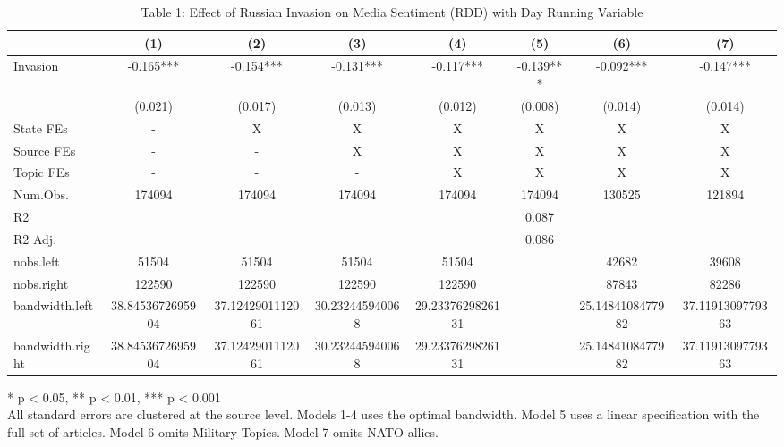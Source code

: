 \begin{table}[!t]
\caption{Table 1: Effect of Russian Invasion on Media Sentiment (RDD) with Day Running Variable} 
\fontsize{12.0pt}{14.4pt}\selectfont
\begin{tabular*}{\linewidth}{@{\extracolsep{\fill}}lccccccc}
\toprule
  & (1) & (2) & (3) & (4) & (5) & (6) & (7) \\ 
\midrule\addlinespace[2.5pt]
Invasion & -0.165*** & -0.154*** & -0.131*** & -0.117*** & -0.139*** & -0.092*** & -0.147*** \\ 
{} & {(0.021)} & {(0.017)} & {(0.013)} & {(0.012)} & {(0.008)} & {(0.014)} & {(0.014)} \\ 
State FEs & - & X & X & X & X & X & X \\ 
Source FEs & - & - & X & X & X & X & X \\ 
Topic FEs & - & - & - & X & X & X & X \\ 
Num.Obs. & 174094 & 174094 & 174094 & 174094 & 174094 & 130525 & 121894 \\ 
R2 &  &  &  &  & 0.087 &  &  \\ 
R2 Adj. &  &  &  &  & 0.086 &  &  \\ 
nobs.left & 51504 & 51504 & 51504 & 51504 &  & 42682 & 39608 \\ 
nobs.right & 122590 & 122590 & 122590 & 122590 &  & 87843 & 82286 \\ 
bandwidth.left & 38.8453672695904 & 37.1242901112061 & 30.232445940068 & 29.2337629826131 &  & 25.1484108477982 & 37.1191309779363 \\ 
bandwidth.right & 38.8453672695904 & 37.1242901112061 & 30.232445940068 & 29.2337629826131 &  & 25.1484108477982 & 37.1191309779363 \\ 
\bottomrule
\end{tabular*}
\begin{minipage}{\linewidth}
* p < 0.05, ** p < 0.01, *** p < 0.001\\
All standard errors are clustered at the source level. Models 1-4 uses the
optimal bandwidth. Model 5 uses a linear specification with the full set of
articles. Model 6 omits Military Topics. Model 7 omits NATO allies.\\
\end{minipage}
\end{table}

